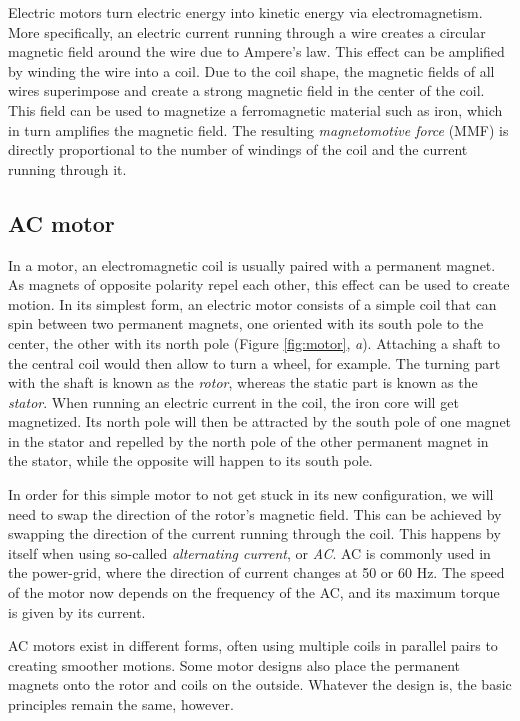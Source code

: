 Electric motors turn electric energy into kinetic energy via electromagnetism. More specifically, an electric current running through a wire creates a circular magnetic field around the wire due to Ampere's law. This effect can be amplified by winding the wire into a coil. Due to the coil shape, the magnetic fields of all wires superimpose and create a strong magnetic field in the center of the coil. This field can be used to magnetize a ferromagnetic material such as iron, which in turn amplifies the magnetic field. The resulting \textsl{magnetomotive force} (MMF) is directly proportional to the number of windings of the coil and the current running through it.

\subsection{AC motor}
In a motor, an electromagnetic coil is usually paired with a permanent magnet. As magnets of opposite polarity repel each other, this effect can be used to create motion. In its simplest form, an electric motor consists of a simple coil that can spin between two permanent magnets, one oriented with its south pole to the center, the other with its north pole (Figure \ref{fig:motor}, \emph{a}). Attaching a shaft to the central coil would then allow to turn a wheel, for example. The turning part with the shaft is known as the \textsl{rotor}, whereas the static part is known as the \textsl{stator}. When running an electric current in the coil, the iron core will get magnetized. Its north pole will then be attracted by the south pole of one magnet in the stator and repelled by the north pole of the other permanent magnet in the stator, while the opposite will happen to its south pole.

In order for this simple motor to not get stuck in its new configuration, we will need to swap the direction of the rotor's magnetic field. This can be achieved by swapping the direction of the current running through the coil. This happens by itself when using so-called \textsl{alternating current}, or \textsl{AC}. AC is commonly used in the power-grid, where the direction of current changes at 50 or 60 Hz. The speed of the motor now depends on the frequency of the AC, and its maximum torque is given by its current.

AC motors exist in different forms, often using multiple coils in parallel pairs to creating smoother motions. Some motor designs also place the permanent magnets onto the rotor and coils on the outside. Whatever the design is, the basic principles remain the same, however.

